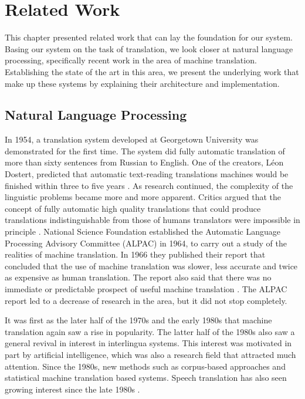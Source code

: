 
\chapter{Related Work}
\label{ch:related_work}
This chapter presented related work that can lay the foundation for our system. Basing our system on the task of translation, we look closer at natural language processing, specifically recent work in the area of machine translation. Establishing the state of the art in this area, we present the underlying work that make up these systems by explaining their architecture and implementation.


\section{Natural Language Processing}
\label{sec:natural_language_processing}
In 1954, a translation system developed at Georgetown University was demonstrated for the first time. The system did fully automatic translation of more than sixty sentences from Russian to English. One of the creators, Léon Dostert, predicted that automatic text-reading translations machines would be finished within three to five years \citep{hutchins1997first}. As research continued, the complexity of the linguistic problems became more and more apparent. Critics argued that the concept of fully automatic high quality translations that could produce translations indistinguishable from those of humans translators were impossible in principle \citep{hutchins2007machine}. National Science Foundation established the Automatic Language Processing Advisory Committee (ALPAC) in 1964, to carry out a study of the realities of machine translation. In 1966 they published their report that concluded that the use of machine translation was slower, less accurate and twice as expensive as human translation. The report also said that there was no immediate or predictable prospect of useful machine translation \citep{hutchins2007machine, national1966language, koehn2010statistical}. The ALPAC report led to a decrease of research in the area, but it did not stop completely.

It was first as the later half of the 1970s and the early 1980s that machine translation again saw a rise in popularity. The latter half of the 1980s also saw a general revival in interest in interlingua systems. This interest was motivated in part by artificial intelligence, which was also a research field that attracted much attention. Since the 1980s, new methods such as corpus-based approaches and statistical machine translation based systems. Speech translation has also seen growing interest since the late 1980s \citep{hutchins2007machine}.

